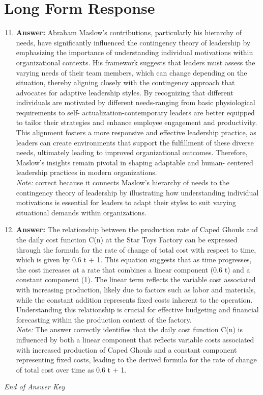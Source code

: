 \documentclass[12pt]{article}
\begin{document}
\section*{Long Form Response}
\begin{enumerate}[label=\arabic*.]
\setcounter{enumi}{10}
\item \textbf{Answer:} Abraham Maslow's contributions, particularly his hierarchy of needs, have significantly influenced the contingency theory of leadership by emphasizing the importance of understanding individual motivations within organizational contexts. His framework suggests that leaders must assess the varying needs of their team members, which can change depending on the situation, thereby aligning closely with the contingency approach that advocates for adaptive leadership styles. By recognizing that different individuals are motivated by different needs-ranging from basic physiological requirements to self- actualization-contemporary leaders are better equipped to tailor their strategies and enhance employee engagement and productivity. This alignment fosters a more responsive and effective leadership practice, as leaders can create environments that support the fulfillment of these diverse needs, ultimately leading to improved organizational outcomes. Therefore, Maslow's insights remain pivotal in shaping adaptable and human- centered leadership practices in modern organizations.
\\ \textit{Note:} correct because it connects Maslow's hierarchy of needs to the contingency theory of leadership by illustrating how understanding individual motivations is essential for leaders to adapt their styles to suit varying situational demands within organizations.
\item \textbf{Answer:} The relationship between the production rate of Caped Ghouls and the daily cost function C(n) at the Star Toys Factory can be expressed through the formula for the rate of change of total cost with respect to time, which is given by 0.6 t + 1. This equation suggests that as time progresses, the cost increases at a rate that combines a linear component (0.6 t) and a constant component (1). The linear term reflects the variable cost associated with increasing production, likely due to factors such as labor and materials, while the constant addition represents fixed costs inherent to the operation. Understanding this relationship is crucial for effective budgeting and financial forecasting within the production context of the factory.
\\ \textit{Note:} The answer correctly identifies that the daily cost function C(n) is influenced by both a linear component that reflects variable costs associated with increased production of Caped Ghouls and a constant component representing fixed costs, leading to the derived formula for the rate of change of total cost over time as 0.6 t + 1.
\end{enumerate}

\vfill
\noindent\textit{End of Answer Key}
\end{document}
